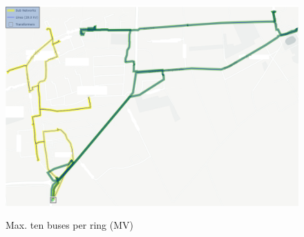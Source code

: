 \begin{figure}[h]
	\begin{centering}
		{\includegraphics[scale=0.4]{figures/experiments/ringsize/ringsize10_2.png}}
		\caption{Max. ten buses per ring (MV)}
		\label{fig:ringsize10_2}
	\end{centering}
\end{figure}
